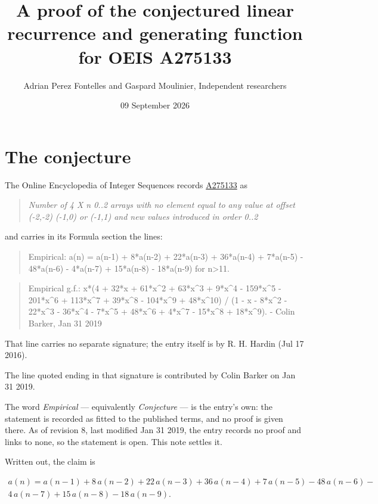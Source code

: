 \documentclass[11pt]{article}
\title{A proof of the conjectured linear recurrence and generating function for OEIS A275133}
\author{Adrian Perez Fontelles and Gaspard Moulinier, Independent researchers}
\date{09 September 2026}
\theoremstyle{definition}
\begin{document}
\maketitle
\section{The conjecture}

The Online Encyclopedia of Integer Sequences records \href{https://oeis.org/A275133}{A275133} as

\begin{quote}\itshape Number of 4 X n 0..2 arrays with no element equal to any value at offset (-2,-2) (-1,0) or (-1,1) and new values introduced in order 0..2\end{quote}

and carries in its Formula section the lines:

\begin{quote}\ttfamily Empirical: a(n) = a(n-1) + 8*a(n-2) + 22*a(n-3) + 36*a(n-4) + 7*a(n-5) - 48*a(n-6) - 4*a(n-7) + 15*a(n-8) - 18*a(n-9) for n>11.\end{quote}

\begin{quote}\ttfamily Empirical g.f.: x*(4 + 32*x + 61*x\textasciicircum{}2 + 63*x\textasciicircum{}3 + 9*x\textasciicircum{}4 - 159*x\textasciicircum{}5 - 201*x\textasciicircum{}6 + 113*x\textasciicircum{}7 + 39*x\textasciicircum{}8 - 104*x\textasciicircum{}9 + 48*x\textasciicircum{}10) / (1 - x - 8*x\textasciicircum{}2 - 22*x\textasciicircum{}3 - 36*x\textasciicircum{}4 - 7*x\textasciicircum{}5 + 48*x\textasciicircum{}6 + 4*x\textasciicircum{}7 - 15*x\textasciicircum{}8 + 18*x\textasciicircum{}9). - Colin Barker, Jan 31 2019\end{quote}

That line carries no separate signature; the entry itself is by R. H. Hardin (Jul 17 2016).

The line quoted ending in that signature is contributed by Colin Barker on Jan 31 2019.

The word {\itshape Empirical} --- equivalently {\itshape Conjecture} --- is the entry's own: the statement is recorded as fitted to the published terms, and no proof is given there. As of revision 8, last modified Jan 31 2019, the entry records no proof and links to none, so the statement is open. This note settles it.

Written out, the claim is

\begin{multline*} a(n) = a(n-1) + 8\,a(n-2) + 22\,a(n-3) + 36\,a(n-4) + 7\,a(n-5) - 48\,a(n-6) - \\ 4\,a(n-7) + 15\,a(n-8) - 18\,a(n-9). \end{multline*}
\end{document}
